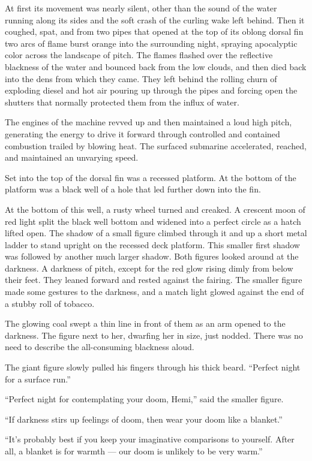 \documentclass[
]{scrbook}
\begin{document}
At first its movement was nearly silent, other than the sound of the
water running along its sides and the soft crash of the curling wake
left behind. Then it coughed, spat, and from two pipes that opened at
the top of its oblong dorsal fin two arcs of flame burst orange into the
surrounding night, spraying apocalyptic color across the landscape of
pitch. The flames flashed over the reflective blackness of the water and
bounced back from the low clouds, and then died back into the dens from
which they came. They left behind the rolling churn of exploding diesel
and hot air pouring up through the pipes and forcing open the shutters
that normally protected them from the influx of water.

The engines of the machine revved up and then maintained a loud high
pitch, generating the energy to drive it forward through controlled and
contained combustion trailed by blowing heat. The surfaced submarine
accelerated, reached, and maintained an unvarying speed.

Set into the top of the dorsal fin was a recessed platform. At the
bottom of the platform was a black well of a hole that led further down
into the fin.

At the bottom of this well, a rusty wheel turned and creaked. A crescent
moon of red light split the black well bottom and widened into a perfect
circle as a hatch lifted open. The shadow of a small figure climbed
through it and up a short metal ladder to stand upright on the recessed
deck platform. This smaller first shadow was followed by another much
larger shadow. Both figures looked around at the darkness. A darkness of
pitch, except for the red glow rising dimly from below their feet. They
leaned forward and rested against the fairing. The smaller figure made
some gestures to the darkness, and a match light glowed against the end
of a stubby roll of tobacco.

The glowing coal swept a thin line in front of them as an arm opened to
the darkness. The figure next to her, dwarfing her in size, just nodded.
There was no need to describe the all-consuming blackness aloud.

The giant figure slowly pulled his fingers through his thick beard.
``Perfect night for a surface run.''

``Perfect night for contemplating your doom, Hemi,'' said the smaller
figure.

``If darkness stirs up feelings of doom, then wear your doom like a
blanket.''

``It's probably best if you keep your imaginative comparisons to
yourself. After all, a blanket is for warmth --- our doom is unlikely to
be very warm.''
\end{document}

